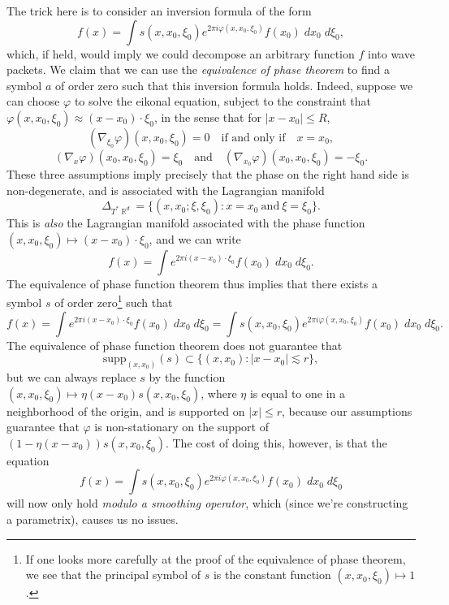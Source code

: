 \documentclass{article}
\theoremstyle{plain}
\theoremstyle{remark}
\theoremstyle{definition}
\DeclareMathOperator{\RR}{\mathbb{R}}
\begin{document}
The trick here is to consider an inversion formula of the form
%
\[ f(x) = \int s(x,x_0,\xi_0) e^{2 \pi i \varphi(x,x_0,\xi_0)} f(x_0)\; dx_0\; d\xi_0, \]
%
which, if held, would imply we could decompose an arbitrary function $f$ into wave packets. We claim that we can use the \emph{equivalence of phase theorem} to find a symbol $a$ of order zero such that this inversion formula holds. Indeed, suppose we can choose $\varphi$ to solve the eikonal equation, subject to the constraint that $\varphi(x,x_0,\xi_0) \approx (x - x_0) \cdot \xi_0$, in the sense that for $|x - x_0| \leq R$,
%
\[ (\nabla_{\xi_0} \varphi)(x,x_0,\xi_0) = 0 \quad\text{if and only if}\quad x = x_0, \]
%
\[ (\nabla_x \varphi)(x_0,x_0,\xi_0) = \xi_0 \quad\text{and}\quad (\nabla_{x_0} \varphi)(x_0,x_0,\xi_0) = - \xi_0. \]
%
These three assumptions imply precisely that the phase on the right hand side is non-degenerate, and is associated with the Lagrangian manifold
%
\[ \Delta_{T^* \RR^d} = \Big\{ (x,x_0;\xi,\xi_0): x = x_0\ \text{and}\ \xi = \xi_0 \Big\}. \]
%
This is \emph{also} the Lagrangian manifold associated with the phase function $(x,x_0,\xi_0) \mapsto (x - x_0) \cdot \xi_0$, and we can write
%
\[ f(x) = \int e^{2 \pi i (x - x_0) \cdot \xi_0} f(x_0)\; dx_0\; d\xi_0. \]
%
The equivalence of phase function theorem thus implies that there exists a symbol $s$ of order zero\footnote{If one looks more carefully at the proof of the equivalence of phase theorem, we see that the principal symbol of $s$ is the constant function $(x,x_0,\xi_0) \mapsto 1$.} such that
%
\[ f(x) = \int e^{2 \pi i (x - x_0) \cdot \xi_0} f(x_0)\; dx_0\; d\xi_0 = \int s(x,x_0,\xi_0) e^{2 \pi i \varphi(x,x_0,\xi_0)} f(x_0)\; dx_0\; d\xi_0. \]
%
The equivalence of phase function theorem does not guarantee that
%
\[ \text{supp}_{(x,x_0)}(s) \subset \{ (x,x_0) : |x - x_0| \lesssim r \}, \]
%
but we can always replace $s$ by the function $(x,x_0,\xi_0) \mapsto \eta(x - x_0) s(x,x_0,\xi_0)$, where $\eta$ is equal to one in a neighborhood of the origin, and is supported on $|x| \leq r$, because our assumptions guarantee that $\varphi$ is non-stationary on the support of $(1 - \eta(x - x_0)) s(x,x_0,\xi_0)$. The cost of doing this, however, is that the equation
%
\[ f(x) = \int s(x,x_0,\xi_0) e^{2 \pi i \varphi(x,x_0,\xi_0)} f(x_0)\; dx_0\; d\xi_0 \]
%
will now only hold \emph{modulo a smoothing operator}, which (since we're constructing a parametrix), causes us no issues.
\end{document}
